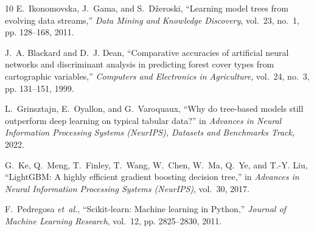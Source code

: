\documentclass[conference]{IEEEtran}
\theoremstyle{plainhead}
\begin{document}
\begin{thebibliography}{10}
E.~Ikonomovska, J.~Gama, and S.~D{\v{z}}eroski, ``Learning model trees from
  evolving data streams,'' \emph{Data Mining and Knowledge Discovery}, vol.~23,
  no.~1, pp. 128--168, 2011.

J.~A. Blackard and D.~J. Dean, ``Comparative accuracies of artificial neural
  networks and discriminant analysis in predicting forest cover types from
  cartographic variables,'' \emph{Computers and Electronics in Agriculture},
  vol.~24, no.~3, pp. 131--151, 1999.

L.~Grinsztajn, E.~Oyallon, and G.~Varoquaux, ``Why do tree-based models still
  outperform deep learning on typical tabular data?'' in \emph{Advances in
  Neural Information Processing Systems (NeurIPS), Datasets and Benchmarks
  Track}, 2022.

G.~Ke, Q.~Meng, T.~Finley, T.~Wang, W.~Chen, W.~Ma, Q.~Ye, and T.-Y. Liu,
  ``{LightGBM}: A highly efficient gradient boosting decision tree,'' in
  \emph{Advances in Neural Information Processing Systems (NeurIPS)}, vol.~30,
  2017.

F.~Pedregosa \emph{et~al.}, ``Scikit-learn: Machine learning in {P}ython,''
  \emph{Journal of Machine Learning Research}, vol.~12, pp. 2825--2830, 2011.

\end{thebibliography}
\end{document}

